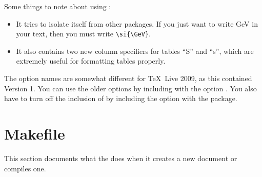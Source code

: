 Some things to note about using :
\begin{itemize}
\item It tries to isolate itself from other packages.
  If you just want to write \si{\GeV} in your text,
  then you must write \verb|\si{\GeV}|.
\item It also contains two new column specifiers for tables ``S'' and ``s'',
  which are extremely useful for formatting tables properly.
\end{itemize}

The option names are somewhat different for \TeX\ Live 2009,
as this contained  Version 1.
You can use the older options by including  with the 
option .
You also have to turn off the inclusion of  by including the option  with
the  package.


\appendix
\clearpage
\section{Makefile}
\label{sec:makefile}

This section documents what the  does when it creates a new document
or compiles one.


